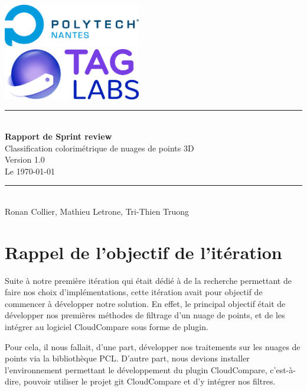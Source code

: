 \documentclass[12pt,titlepage,french]{article}
\begin{document}

\begin{titlepage}
\newcommand{\HRule}{\rule{\linewidth}{0.5mm}}
\center

  \includegraphics[width=0.45\textwidth]{../../ressources/img_logos/logo_polytech.png}\\[1cm]

  \includegraphics[width=0.45\textwidth]{../../ressources/img_logos/logo_taglabs.png}


\HRule \\[0.4cm]
{ \huge \bfseries Rapport de Sprint review\\[0.15cm] }
Classification colorimétrique de nuages de points 3D\\
Version 1.0\\
Le \today \\
\HRule \\[1.5cm]
Ronan Collier,
Mathieu Letrone,
Tri-Thien Truong
\\[1cm]
\end{titlepage}

\tableofcontents %
\newpage
\listoffigures  %
\newpage

\section{Rappel de l'objectif de l'itération}

Suite à notre première itération qui était dédié à de la recherche permettant de faire nos choix d'implémentations, cette itération avait pour objectif de commencer à développer notre solution. En effet, le principal objectif était de développer nos premières méthodes de filtrage d'un nuage de points, et de les intégrer au logiciel CloudCompare sous forme de plugin.

Pour cela, il nous fallait, d'une part, développer nos traitements sur les nuages de points via la bibliothèque PCL. D'autre part, nous devions installer l'environnement permettant le développement du plugin CloudCompare, c'est-à-dire, pouvoir utiliser le projet git CloudCompare et d'y intégrer nos filtres.
\end{document}
